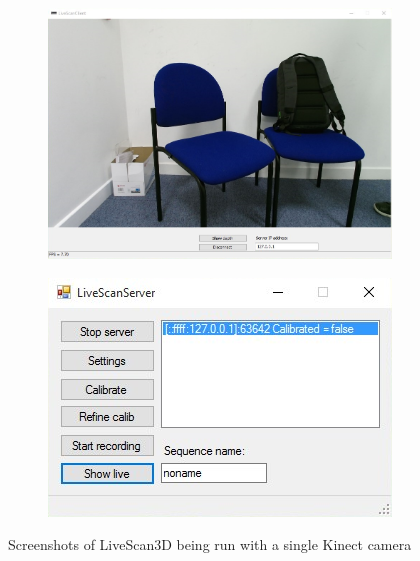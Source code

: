 \documentclass{article}
\begin{document}
\begin{figure}[h]
\centering
\begin{subfigure}{.49\textwidth}
  \centering
  \includegraphics[scale=0.4]{livescanclient}
\end{subfigure}
\begin{subfigure}{.49\textwidth}
  \centering
  \includegraphics[scale=1.2]{livescanserver}
\end{subfigure}
  \caption{Screenshots of LiveScan3D being run with a single Kinect camera}
  \label{fig:livescan}
\end{figure}
\end{document}

